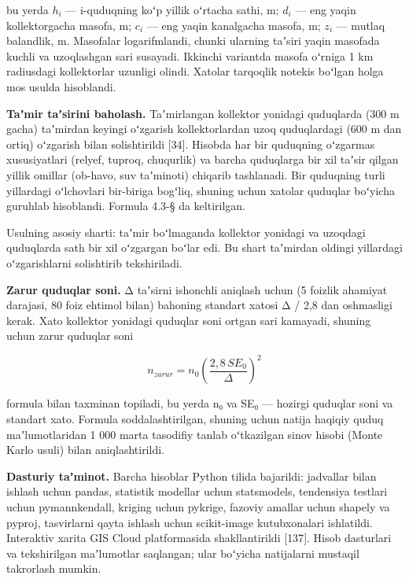 \documentclass[14pt,a4paper,oneside]{extreport}
\begin{document}
bu yerda $h_{i}$ --- i-quduqning koʻp yillik oʻrtacha sathi, m; $d_{i}$ --- eng
yaqin kollektorgacha masofa, m; $c_{i}$ --- eng yaqin kanalgacha masofa, m;
$z_{i}$ --- mutlaq balandlik, m. Masofalar logarifmlandi, chunki ularning
taʼsiri yaqin masofada kuchli va uzoqlashgan sari susayadi. Ikkinchi
variantda masofa oʻrniga 1 km radiusdagi kollektorlar uzunligi olindi.
Xatolar tarqoqlik notekis boʻlgan holga mos usulda hisoblandi.

\textbf{Taʼmir taʼsirini baholash.} Taʼmirlangan kollektor yonidagi
quduqlarda (300 m gacha) taʼmirdan keyingi oʻzgarish kollektorlardan
uzoq quduqlardagi (600 m dan ortiq) oʻzgarish bilan solishtirildi
{[}34{]}. Hisobda har bir quduqning oʻzgarmas xususiyatlari (relyef,
tuproq, chuqurlik) va barcha quduqlarga bir xil taʼsir qilgan yillik
omillar (ob-havo, suv taʼminoti) chiqarib tashlanadi. Bir quduqning
turli yillardagi oʻlchovlari bir-biriga bogʻliq, shuning uchun xatolar
quduqlar boʻyicha guruhlab hisoblandi. Formula 4.3-§ da keltirilgan.

Usulning asosiy sharti: taʼmir boʻlmaganda kollektor yonidagi va
uzoqdagi quduqlarda sath bir xil oʻzgargan boʻlar edi. Bu shart
taʼmirdan oldingi yillardagi oʻzgarishlarni solishtirib tekshiriladi.

\textbf{Zarur quduqlar soni.} Δ taʼsirni ishonchli aniqlash uchun (5
foizlik ahamiyat darajasi, 80 foiz ehtimol bilan) bahoning standart
xatosi Δ / 2,8 dan oshmasligi kerak. Xato kollektor yonidagi quduqlar
soni ortgan sari kamayadi, shuning uchun zarur quduqlar soni

\begin{equation}\tag{2.11}
n_{zarur} = n_0 \left( \frac{2{,}8 \, SE_0}{\Delta} \right)^2
\end{equation}

formula bilan taxminan topiladi, bu yerda n₀ va SE₀ --- hozirgi quduqlar
soni va standart xato. Formula soddalashtirilgan, shuning uchun natija
haqiqiy quduq maʼlumotlaridan 1 000 marta tasodifiy tanlab oʻtkazilgan
sinov hisobi (Monte Karlo usuli) bilan aniqlashtirildi.

\textbf{Dasturiy taʼminot.} Barcha hisoblar Python tilida bajarildi:
jadvallar bilan ishlash uchun pandas, statistik modellar uchun
statsmodels, tendensiya testlari uchun pymannkendall, kriging uchun
pykrige, fazoviy amallar uchun shapely va pyproj, tasvirlarni qayta
ishlash uchun scikit-image kutubxonalari ishlatildi. Interaktiv xarita
GIS Cloud platformasida shakllantirildi {[}137{]}. Hisob dasturlari va
tekshirilgan maʼlumotlar saqlangan; ular boʻyicha natijalarni mustaqil
takrorlash mumkin.
\end{document}
